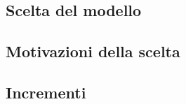 \subsection{Scelta del modello}\label{sec:Scelta-modello}

\newpage
\subsection{Motivazioni della scelta}\label{sec:Motivazioni}


\subsection{Incrementi}\label{sec:Incrementi}

    
